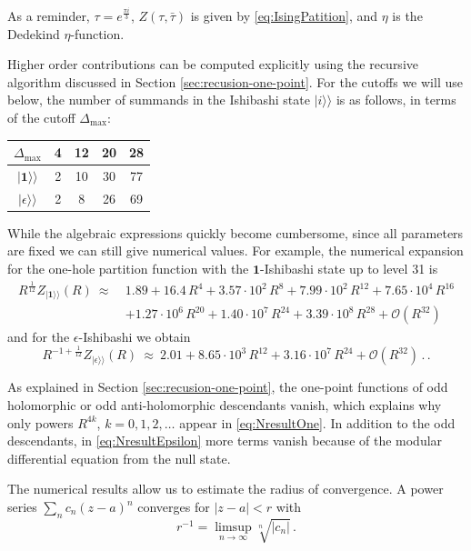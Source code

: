 \documentclass[11pt,a4paper]{article}
\numberwithin{equation}{section}
\def\ket#1{|{#1}\rangle}
\newcommand{\one}{\mathbf{1}} %
\begin{document}
\noindent
As a reminder, $\tau = e^{\frac{\pi i}{3}}$, $Z(\tau,\bar{\tau})$ is given by \eqref{eq:IsingPatition}, and $\eta$ is the  Dedekind $\eta$-function. 

Higher order contributions can be computed explicitly using the recursive algorithm discussed in Section \ref{sec:recusion-one-point}. 
For the cutoffs we will use below, the number of summands in the Ishibashi state $\ket{i}\!\rangle$ is as follows, in terms of the cutoff $\Delta_\mathrm{max}$: 

\begin{center}
    \begin{tabular}{c|c|c|c|c}
        $\Delta_\mathrm{max}$ & 4 & 12 & 20 & 28 \\
        \hline
        $\ket{\one}\!\rangle$ & 2 & 10 & 30 & 77 \\
        $\ket{\epsilon}\!\rangle$ & 2 & 8 & 26 & 69
    \end{tabular}
\end{center}

While the algebraic expressions quickly become cumbersome,  
since all parameters are fixed we can still give numerical values. For example, the numerical expansion for the one-hole partition function with the $\one$-Ishibashi state up to level 31 is 
%
\begin{align}
    R^{\frac{1}{12}} Z_{\ket{\one}\!\rangle}(R) ~\approx~ &  1.89 + 16.4 \,R^4 + 3.57 \cdot 10^2 \,R^8 + 7.99 \cdot 10^2 \,R^{12} + 7.65 \cdot 10^4 \,R^{16}\nonumber \\
    &+ 1.27 \cdot 10^6 \,R^{20} + 1.40 \cdot 10^7 \,R^{24} + 3.39 \cdot 10^8 \,R^{28} + \mathcal{O}(R^{32}) 
    \label{eq:NresultOne}
\end{align}
%
and for the $\epsilon$-Ishibashi we obtain
%
\begin{equation}
    R^{-1+\frac{1}{12}} Z_{\ket{\epsilon}\!\rangle}(R) ~\approx~ 2.01 + 8.65\cdot 10^3\, R^{12} + 3.16\cdot 10^7 \, R^{24} +\mathcal{O}(R^{32})\,.
    \,. \label{eq:NresultEpsilon}
\end{equation}
%

\noindent 
As explained in Section \ref{sec:recusion-one-point}, the one-point functions of odd holomorphic or odd anti-holomorphic descendants vanish, which explains why only powers $R^{4k}$, $k=0,1,2,\dots$ appear in \eqref{eq:NresultOne}. In addition to the odd descendants, in \eqref{eq:NresultEpsilon} more terms vanish because of the modular differential equation from the null state. 

The numerical results allow us to estimate the
radius of convergence. A power series $\sum_{n} c_n (z-a)^n$
converges for $|z-a|<r$ with
%
\begin{equation}
    r^{-1} = \limsup\limits_{n\to\infty} \sqrt[n]{|c_n|} \,.
\end{equation}
\end{document}
